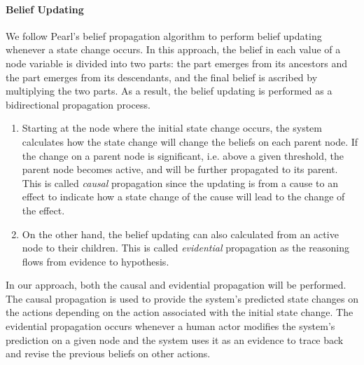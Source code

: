 \paragraph*{Belief Updating} %
\label{par:belief_updating}
We follow Pearl’s belief propagation algorithm \cite{pearl1988probabilistic} to perform belief updating whenever a state change occurs. In this approach, the belief in each value of a node variable is divided into two parts: the part emerges from its ancestors and the part emerges from its descendants, and the final belief is ascribed by multiplying the two parts. As a result, the belief updating is performed as a bidirectional propagation process. 
\begin{enumerate}
	\item Starting at the node where the initial state change occurs, the system calculates how the state change will change the beliefs on each parent node. If the change on a parent node is significant, i.e. above a given threshold, the parent node becomes active, and will be further propagated to its parent. This is called \emph{causal} propagation since the updating is from a cause to an effect to indicate how a state change of the cause will lead to the change of the effect. 
	\item On the other hand, the belief updating can also calculated from an active node to their children. This is called \emph{evidential} propagation as the reasoning flows from evidence to hypothesis.
\end{enumerate}

In our approach, both the causal and evidential propagation will be performed. The causal propagation is used to provide the system's predicted state changes on the actions depending on the action associated with the initial state change. The evidential propagation occurs whenever a human actor modifies the system’s prediction on a given node and the system uses it as an evidence to trace back and revise the previous beliefs on other actions.

